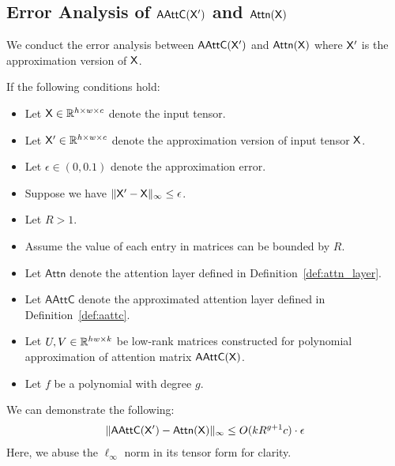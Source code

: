 \subsection{Error Analysis of \texorpdfstring{$\mathsf{AAttC}(\mathsf{X}')$}{} and \texorpdfstring{$\mathsf{Attn}(\mathsf{X})$}{}}\label{sec:error_analysis_of_aattc_x_prime_attn_x}
We conduct the error analysis between $\mathsf{AAttC}(\mathsf{X}')$ and $\mathsf{Attn}(\mathsf{X})$ where $\mathsf{X}'$ is the approximation version of $\mathsf{X}$.
\begin{lemma}\label{lem:error_analysis_aattc_attn}
    If the following conditions hold:
    \begin{itemize}
        \item Let $\mathsf{X} \in \mathbb{R}^{h \times w \times c}$ denote the input tensor.
        \item Let $\mathsf{X}' \in \mathbb{R}^{h \times w \times c}$ denote the approximation version of input tensor $\mathsf{X}$.
        \item Let $\epsilon \in (0, 0.1)$ denote the approximation error. 
        \item Suppose we have $\| \mathsf{X}' - \mathsf{X} \|_\infty \leq \epsilon$.
        \item Let $R > 1$.
        \item Assume the value of each entry in matrices can be bounded by $R$. 
        \item Let $\mathsf{Attn}$ denote the attention layer defined in Definition~\ref{def:attn_layer}.
        \item Let $\mathsf{AAttC}$ denote the approximated attention layer defined in Definition~\ref{def:aattc}.
        \item Let $U,V \in \mathbb{R}^{hw \times k}$ be low-rank matrices constructed for polynomial approximation of attention matrix $\mathsf{AAttC}(\mathsf{X})$.
        \item Let $f$ be a polynomial with degree $g$.
    \end{itemize}
    We can demonstrate the following:
    \begin{align*}
        \| \mathsf{AAttC}(\mathsf{X}') - \mathsf{Attn}(\mathsf{X}) \|_\infty \leq O( k R^{g+1} c) \cdot \epsilon
    \end{align*}
    Here, we abuse the $\ell_\infty$ norm in its tensor form for clarity.
\end{lemma}


